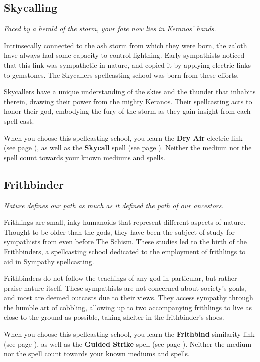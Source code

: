 \subsection*{Skycalling} \label{ssec::skycalling}
    \textit{Faced by a herald of the storm, your fate now lies in Keranos' hands.}

    Intrinsecally connected to the ash storm from which they were born, the zaloth have always had some capacity to control lightning.
    Early sympathists noticed that this link was sympathetic in nature, and copied it by applying electric links to gemstones.
    The Skycallers spellcasting school was born from these efforts.

    Skycallers have a unique understanding of the skies and the thunder that inhabits therein, drawing their power from the mighty Keranos.
    Their spellcasting acts to honor their god, embodying the fury of the storm as they gain insight from each spell cast.

    When you choose this spellcasting school, you learn the \textbf{Dry Air} electric link (see page \pageref{medium::dryair}), as well as the \textbf{Skycall} spell (see page \pageref{spell::skycall}).
    Neither the medium nor the spell count towards your known mediums and spells.

\subsection*{Frithbinder} \label{ssec::frithbinder}
    \textit{Nature defines our path as much as it defined the path of our ancestors.}

    Frithlings are small, inky humanoids that represent different aspects of nature.
    Thought to be older than the gods, they have been the subject of study for sympathists from even before The Schism.
    These studies led to the birth of the Frithbinders, a spellcasting school dedicated to the employment of frithlings to aid in Sympathy spellcasting.

    Frithbinders do not follow the teachings of any god in particular, but rather praise nature itself.
    These sympathists are not concerned about society's goals, and most are deemed outcasts due to their views.
    They access sympathy through the humble art of cobbling, allowing up to two accompanying frithlings to live as close to the ground as possible, taking shelter in the frithbinder's shoes.

    When you choose this spellcasting school, you learn the \textbf{Frithbind} similarity link (see page \pageref{medium::frithbind}), as well as the \textbf{Guided Strike} spell (see page \pageref{spell::guidedstrike}).
    Neither the medium nor the spell count towards your known mediums and spells.

\newpage
